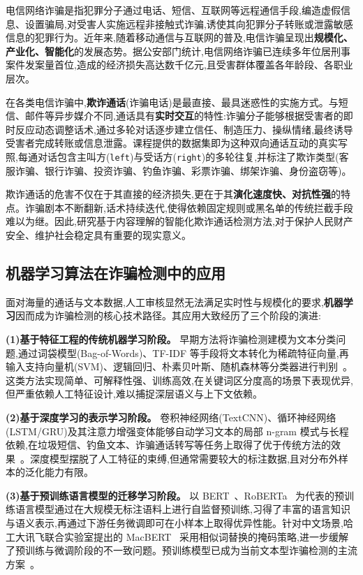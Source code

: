 \documentclass[11pt,a4paper]{article}
\begin{document}
电信网络诈骗是指犯罪分子通过电话、短信、互联网等远程通信手段,编造虚假信息、设置骗局,对受害人实施远程非接触式诈骗,诱使其向犯罪分子转账或泄露敏感信息的犯罪行为。近年来,随着移动通信与互联网的普及,电信诈骗呈现出\textbf{规模化、产业化、智能化}的发展态势。据公安部门统计,电信网络诈骗已连续多年位居刑事案件发案量首位,造成的经济损失高达数千亿元,且受害群体覆盖各年龄段、各职业层次。

在各类电信诈骗中,\textbf{欺诈通话}(诈骗电话)是最直接、最具迷惑性的实施方式。与短信、邮件等异步媒介不同,通话具有\textbf{实时交互}的特性:诈骗分子能够根据受害者的即时反应动态调整话术,通过多轮对话逐步建立信任、制造压力、操纵情绪,最终诱导受害者完成转账或信息泄露。课程提供的数据集即为这种双向通话互动的真实写照,每通对话包含主叫方(\texttt{left})与受话方(\texttt{right})的多轮往复,并标注了欺诈类型(客服诈骗、银行诈骗、投资诈骗、钓鱼诈骗、彩票诈骗、绑架诈骗、身份盗窃等)。

欺诈通话的危害不仅在于其直接的经济损失,更在于其\textbf{演化速度快、对抗性强}的特点。诈骗剧本不断翻新,话术持续迭代,使得依赖固定规则或黑名单的传统拦截手段难以为继。因此,研究基于内容理解的智能化欺诈通话检测方法,对于保护人民财产安全、维护社会稳定具有重要的现实意义。

\subsection{机器学习算法在诈骗检测中的应用}

面对海量的通话与文本数据,人工审核显然无法满足实时性与规模化的要求,\textbf{机器学习}因而成为诈骗检测的核心技术路径。其应用大致经历了三个阶段的演进:

\textbf{(1)基于特征工程的传统机器学习阶段。} 早期方法将诈骗检测建模为文本分类问题,通过词袋模型(Bag-of-Words)、TF-IDF 等手段将文本转化为稀疏特征向量,再输入支持向量机(SVM)、逻辑回归、朴素贝叶斯、随机森林等分类器进行判别~\cite{deceptivetext2023,lstmcnnsvm2025}。这类方法实现简单、可解释性强、训练高效,在关键词区分度高的场景下表现优异,但严重依赖人工特征设计,难以捕捉深层语义与上下文依赖。

\textbf{(2)基于深度学习的表示学习阶段。} 卷积神经网络(TextCNN)、循环神经网络(LSTM/GRU)及其注意力增强变体能够自动学习文本的局部 n-gram 模式与长程依赖,在垃圾短信、钓鱼文本、诈骗通话转写等任务上取得了优于传统方法的效果~\cite{spamcalltranscript2021}。深度模型摆脱了人工特征的束缚,但通常需要较大的标注数据,且对分布外样本的泛化能力有限。

\textbf{(3)基于预训练语言模型的迁移学习阶段。} 以 BERT~\cite{devlin2019bert}、RoBERTa~\cite{liu2019roberta} 为代表的预训练语言模型通过在大规模无标注语料上进行自监督预训练,习得了丰富的语言知识与语义表示,再通过下游任务微调即可在小样本上取得优异性能。针对中文场景,哈工大讯飞联合实验室提出的 MacBERT~\cite{cui2020macbert} 采用相似词替换的掩码策略,进一步缓解了预训练与微调阶段的不一致问题。预训练模型已成为当前文本型诈骗检测的主流方案~\cite{phishingbertroberta2026}。
\end{document}
